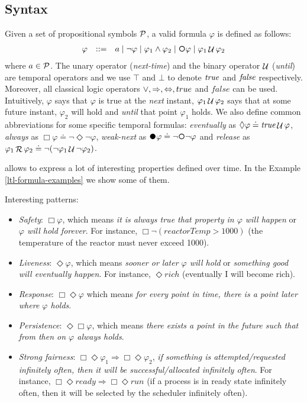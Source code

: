 \subsection{Syntax}
Given a set of propositional symbols $\P$, a valid \LTL formula $\varphi$ is defined as follows:
\[\begin{array}{rcl}
\varphi &::=& a \mid \lnot \varphi \mid \varphi_1\land \varphi_2 \mid \Next\varphi \mid \varphi_1 \lUntil \varphi_2
\end{array}
\]
where $a\in \P$. The unary operator \Next  (\emph{next-time}) and the binary operator $\lUntil$  (\emph{until}) are temporal operators and we use $\top$ and $\bot$ to denote $\true$ and $\false$ respectively. Moreover, all classical logic operators $\lOR, \Rightarrow, \Leftrightarrow, true$ and $false$ can be used. 
Intuitively, \Next $\varphi$ says that $\varphi$ is true at the \textit{next} instant, $\varphi_1 \lUntil \varphi_2$ says that at some future instant, $\varphi_2$ will hold and \textit{until} that point $\varphi_1$ holds. We also define common abbreviations for some specific temporal formulas: \emph{eventually} as $\Diamond \varphi \doteq \true \lUntil \varphi$, \emph{always} as $\Box \varphi \doteq \lnot \Diamond \lnot \varphi$, \emph{weak-next} as $\Wnext \varphi \doteq \lnot \Next \lnot \varphi$ and \emph{release} as $\varphi_1 \Release \varphi_2 \doteq \lnot (\lnot \varphi_1 \lUntil \lnot \varphi_2)$. 

\LTL allows to express a lot of interesting properties defined over time. In the Example \ref{ltl-formula-examples} we show some of them.
\begin{example}\label{ltl-formula-examples}
Interesting \LTL patterns:
\begin{itemize}
	\item \emph{Safety}: $\Box \varphi$, which means \emph{it is always true that property in $\varphi$ will happen} or \emph{$\varphi$ will hold forever}. For instance, $\Box \lnot (reactorTemp > 1000)$ (the temperature of the reactor must never exceed 1000).
	\item \emph{Liveness}: $\Diamond \varphi$, which means \emph{sooner or later $\varphi$ will hold} or \emph{something good will eventually happen}. For instance, $\Diamond rich$ (eventually I will become rich).
	\item \emph{Response}: $\Box \Diamond \varphi$ which means \emph{for every point in time, there is a point later where $\varphi$ holds}.
	\item \emph{Persistence}: $\Diamond \Box \varphi$, which means \emph{there exists a point in the future such that from then on $\varphi$ always holds}.
	\item \emph{Strong fairness}: $\Box \Diamond \varphi_1 \Rightarrow \Box \Diamond \varphi_2$, \emph{if something is attempted/requested infinitely often, then it will be successful/allocated infinitely often}. For instance, $\Box \Diamond ready \Rightarrow \Box \Diamond run$ (if a process is in ready state infinitely often, then it will be selected by the scheduler infinitely often).
\end{itemize}
\end{example}
